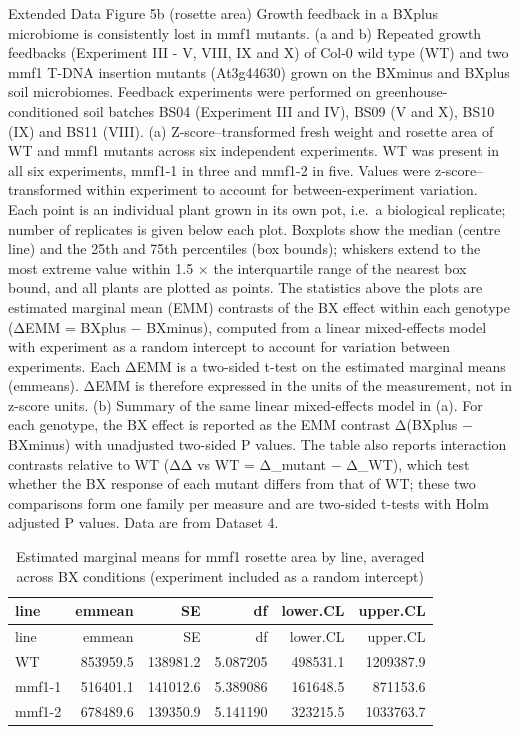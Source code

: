 \documentclass[
  10pt,
]{article}
\begin{document}
Extended Data Figure 5b (rosette area) \textbar{} Growth feedback in a
BXplus microbiome is consistently lost in mmf1 mutants. (a and b)
Repeated growth feedbacks (Experiment III - V, VIII, IX and X) of Col-0
wild type (WT) and two mmf1 T-DNA insertion mutants (At3g44630) grown on
the BXminus and BXplus soil microbiomes. Feedback experiments were
performed on greenhouse-conditioned soil batches BS04 (Experiment III
and IV), BS09 (V and X), BS10 (IX) and BS11 (VIII). (a)
Z-score--transformed fresh weight and rosette area of WT and mmf1
mutants across six independent experiments. WT was present in all six
experiments, mmf1-1 in three and mmf1-2 in five. Values were
z-score--transformed within experiment to account for between-experiment
variation. Each point is an individual plant grown in its own pot,
i.e.~a biological replicate; number of replicates is given below each
plot. Boxplots show the median (centre line) and the 25th and 75th
percentiles (box bounds); whiskers extend to the most extreme value
within 1.5 × the interquartile range of the nearest box bound, and all
plants are plotted as points. The statistics above the plots are
estimated marginal mean (EMM) contrasts of the BX effect within each
genotype (ΔEMM = BXplus − BXminus), computed from a linear mixed-effects
model with experiment as a random intercept to account for variation
between experiments. Each ΔEMM is a two-sided t-test on the estimated
marginal means (emmeans). ΔEMM is therefore expressed in the units of
the measurement, not in z-score units. (b) Summary of the same linear
mixed-effects model in (a). For each genotype, the BX effect is reported
as the EMM contrast Δ(BXplus − BXminus) with unadjusted two-sided P
values. The table also reports interaction contrasts relative to WT (ΔΔ
vs WT = Δ\_mutant − Δ\_WT), which test whether the BX response of each
mutant differs from that of WT; these two comparisons form one family
per measure and are two-sided t-tests with Holm adjusted P values. Data
are from Dataset 4.

\begin{longtable}[]{@{}lrrrrr@{}}
\caption{Estimated marginal means for mmf1 rosette area by line,
averaged across BX conditions (experiment included as a random
intercept)}\tabularnewline
\toprule\noalign{}
line & emmean & SE & df & lower.CL & upper.CL \\
\midrule\noalign{}
\endfirsthead
\toprule\noalign{}
line & emmean & SE & df & lower.CL & upper.CL \\
\midrule\noalign{}
\endhead
\bottomrule\noalign{}
\endlastfoot
WT & 853959.5 & 138981.2 & 5.087205 & 498531.1 & 1209387.9 \\
mmf1-1 & 516401.1 & 141012.6 & 5.389086 & 161648.5 & 871153.6 \\
mmf1-2 & 678489.6 & 139350.9 & 5.141190 & 323215.5 & 1033763.7 \\
\end{longtable}
\end{document}
